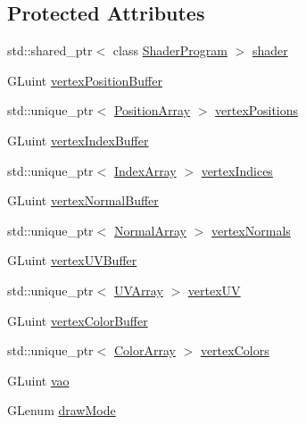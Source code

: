 \subsection*{Protected Attributes}
\begin{DoxyCompactItemize}
\item 
std\+::shared\+\_\+ptr$<$ class \hyperlink{class_shader_program}{Shader\+Program} $>$ \hyperlink{class_rendering_object_ae50e545ce2008ffa802478cd4316e82e}{shader}
\item 
G\+Luint \hyperlink{class_rendering_object_a473f623b39157288bef992e76ddc45a9}{vertex\+Position\+Buffer}
\item 
std\+::unique\+\_\+ptr$<$ \hyperlink{class_rendering_object_a1223b9cf03f2029b9c43d71042c2a18e}{Position\+Array} $>$ \hyperlink{class_rendering_object_a14721712672d0421ed72a394e3131da0}{vertex\+Positions}
\item 
G\+Luint \hyperlink{class_rendering_object_a6740a0a0e6bd4d841c9c211f2a31cca3}{vertex\+Index\+Buffer}
\item 
std\+::unique\+\_\+ptr$<$ \hyperlink{class_rendering_object_a9931c88bca3384065c6691dfe1e60af1}{Index\+Array} $>$ \hyperlink{class_rendering_object_a7b84487d3c34c1ca36b2ac6060b0f802}{vertex\+Indices}
\item 
G\+Luint \hyperlink{class_rendering_object_a91649e3a653f2266cd00c718f10849f9}{vertex\+Normal\+Buffer}
\item 
std\+::unique\+\_\+ptr$<$ \hyperlink{class_rendering_object_a327c4d892de8d6138fb59afa6d078257}{Normal\+Array} $>$ \hyperlink{class_rendering_object_ac28d301f97d29ab603f65f8e823063b4}{vertex\+Normals}
\item 
G\+Luint \hyperlink{class_rendering_object_ad583c70014e3f6ab0c9b62ea3c96ad25}{vertex\+U\+V\+Buffer}
\item 
std\+::unique\+\_\+ptr$<$ \hyperlink{class_rendering_object_a504ecd45ebe36dfa5b78c46d64d9904a}{U\+V\+Array} $>$ \hyperlink{class_rendering_object_afc405316bddec4ba1d5c228ecc0d9061}{vertex\+U\+V}
\item 
G\+Luint \hyperlink{class_rendering_object_aeb014a4ef24e2fc4665a769241660cad}{vertex\+Color\+Buffer}
\item 
std\+::unique\+\_\+ptr$<$ \hyperlink{class_rendering_object_a8a12e1f9be788d99af6c089e1c600022}{Color\+Array} $>$ \hyperlink{class_rendering_object_a65fc52e665791ce55e43106b603e917a}{vertex\+Colors}
\item 
G\+Luint \hyperlink{class_rendering_object_a96dd05670a977a949514a2c490c1c867}{vao}
\item 
G\+Lenum \hyperlink{class_rendering_object_aa67856a72705b54a5667e91e270d00b3}{draw\+Mode}
\end{DoxyCompactItemize}
